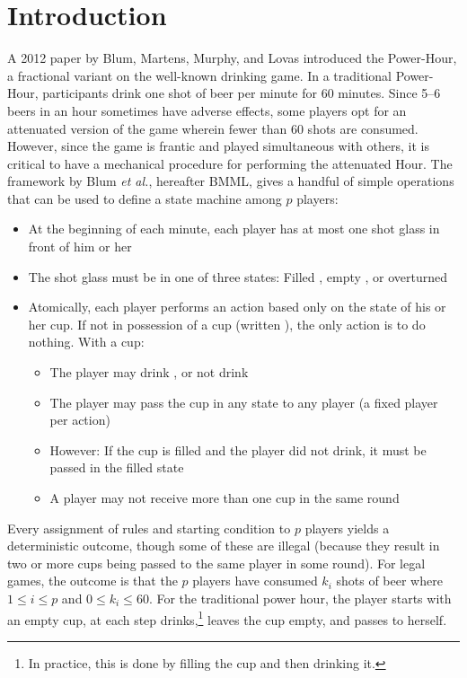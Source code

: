 \documentclass[twocolumn]{article}
\begin{document}
\section*{Introduction}
A 2012 paper by Blum, Martens, Murphy, and Lovas\cite{algorithms}
introduced the \kn Power-Hour, a fractional variant on the well-known
drinking game. In a traditional Power-Hour, participants drink one
shot of beer per minute for 60 minutes. Since 5--6 beers in an hour
sometimes have adverse effects, some players opt for an attenuated
version of the game wherein fewer than 60 shots are consumed. However,
since the game is frantic and played simultaneous with others, it is
critical to have a mechanical procedure for performing the attenuated
Hour. The framework by Blum {\em et al.}, hereafter BMML, gives a
handful of simple operations that can be used to define a state
machine among $p$ players:
\begin{itemize}
  \item At the beginning of each minute, each player has at most one
    shot glass in front of him or her
  \item The shot glass must be in one of three states: Filled \fullcup,
    empty \emptycup, or overturned \overcup
  \item Atomically, each player performs an action based only on the
    state of his or her cup. If not in possession of a cup (written
    \nocup), the only action is to do nothing. With a cup:
  \begin{itemize}
    \item The player may drink \drink, or not drink \nodrink
    \item The player may pass the cup in any state to any player (a
      fixed player per action)
    \item However: If the cup is filled and the player did not drink,
      it must be passed in the filled state
    \item A player may not receive more than one cup in the same round
  \end{itemize}
\end{itemize}

Every assignment of rules and starting condition to $p$ players yields
a deterministic outcome, though some of these are illegal (because
they result in two or more cups being passed to the same player in
some round). For legal games, the outcome is that the $p$ players have
consumed $k_i$ shots of beer where $1 \leq i \leq p$ and $0 \leq k_i
\leq 60$. For the traditional power hour, the player starts with an
empty cup, at each step drinks,\!\footnote{In practice, this is done
  by filling the cup and then drinking it.} leaves the cup empty, and
passes to herself.
\end{document}
